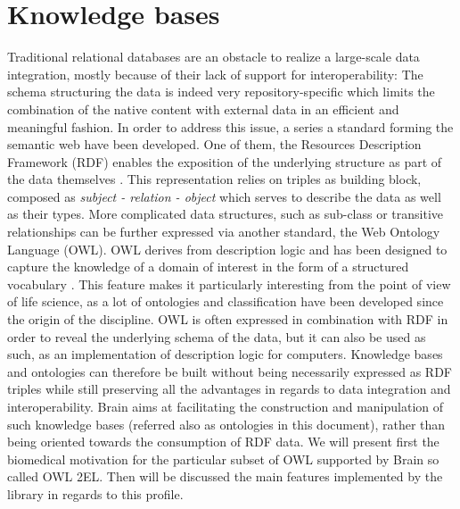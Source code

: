\documentclass{bioinfo}
\begin{document}
\section{Knowledge bases}
Traditional relational databases are an obstacle to realize a large-scale data integration, mostly because of their lack of support for 
interoperability: The schema structuring the data is indeed very repository-specific which limits the combination of the 
native content with external data in an efficient and meaningful fashion. In order to address this issue, 
a series a standard forming the semantic web have been developed. One of them, the Resources Description 
Framework (RDF) enables the exposition of the underlying structure as part of the data themselves \citep{FrankManola}. This
representation relies on triples as building block, composed as \emph{subject - relation - object} which serves to
describe the data as well as their types. More complicated data structures, such as sub-class or
transitive relationships can be further expressed via another standard, the Web Ontology Language (OWL). OWL derives from description logic and
has been designed to capture the knowledge of a domain of interest in the form of a structured vocabulary \citep{W3COWLWorkingGroup}. 
This feature makes it particularly 
interesting from the point of view of life science, as a lot of ontologies and classification have been developed since the origin of 
the discipline. OWL is often expressed in combination with RDF in order to reveal the underlying schema of the data, but 
it can also be used as such, as an implementation of description logic for computers. 
Knowledge bases and ontologies can therefore be built without being necessarily expressed as RDF triples while still preserving all the 
advantages in regards to data integration and interoperability.
Brain aims at facilitating the construction and manipulation of 
such knowledge bases (referred also as ontologies in this document), rather than being oriented towards the consumption of RDF data. 
We will present first the biomedical motivation for the particular subset of OWL supported by Brain so called OWL 2EL. 
Then will be discussed the main features implemented by the library in regards to this profile.
\end{document}
